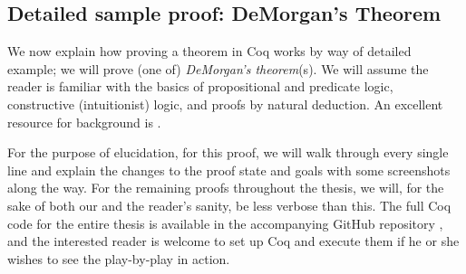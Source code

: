 \documentclass[12pt,notitlepage]{report}
\theoremstyle{plain}
\theoremstyle{definition}
\newcommand{\define}[1]{\emph{#1}\index{#1}}
\numberwithin{equation}{section}
\begin{document}
\subsection{Detailed sample proof: DeMorgan's Theorem}\label{demorgansec}
We now explain how proving a theorem in Coq works by way of detailed example; we will prove (one of) \define{DeMorgan's theorem}(s).  We will assume the reader is familiar with the basics of propositional and predicate logic, constructive (intuitionist) logic, and proofs by natural deduction.  An excellent resource for background is \cite{vanDalen}.
\par For the purpose of elucidation, for this proof, we will walk through every single line and explain the changes to the proof state and goals with some screenshots along the way.  For the remaining proofs throughout the thesis, we will, for the sake of both our and the reader's sanity, be less verbose than this.  The full Coq code for the entire thesis is available in the accompanying GitHub repository \cite{repo}, and the interested reader is welcome to set up Coq and execute them if he or she wishes to see the play-by-play in action.
\end{document}
